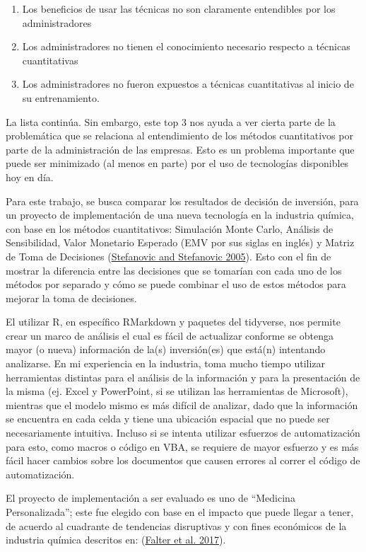 \documentclass[
]{book}
\providecommand{\tightlist}{%
  \setlength{\itemsep}{0pt}\setlength{\parskip}{0pt}}
\begin{document}
\begin{enumerate}
\def\labelenumi{\arabic{enumi}.}
\tightlist
\item
  Los beneficios de usar las técnicas no son claramente entendibles
  por los administradores
\item
  Los administradores no tienen el conocimiento necesario respecto a
  técnicas cuantitativas
\item
  Los administradores no fueron expuestos a técnicas cuantitativas al
  inicio de su entrenamiento.
\end{enumerate}

La lista continúa. Sin embargo, este top 3 nos ayuda a ver cierta parte
de la problemática que se relaciona al entendimiento de los métodos
cuantitativos por parte de la administración de las empresas. Esto es un
problema importante que puede ser minimizado (al menos en parte) por el
uso de tecnologías disponibles hoy en día.

Para este trabajo, se busca comparar los resultados de decisión de
inversión, para un proyecto de implementación de una nueva tecnología
en la industria química, con base en los métodos cuantitativos:
Simulación Monte Carlo, Análisis de Sensibilidad, Valor Monetario
Esperado (EMV por sus siglas en inglés) y Matriz de Toma de Decisiones
(\protect\hyperlink{ref-Stefanovic2005}{Stefanovic and Stefanovic 2005}). Esto con el fin de mostrar la diferencia entre las
decisiones que se tomarían con cada uno de los métodos por separado y
cómo se puede combinar el uso de estos métodos para mejorar la toma de
decisiones.

El utilizar R, en específico RMarkdown y paquetes del tidyverse, nos
permite crear un marco de análisis el cual es fácil de actualizar
conforme se obtenga mayor (o nueva) información de la(s) inversión(es)
que está(n) intentando analizarse. En mi experiencia en la industria,
toma mucho tiempo utilizar herramientas distintas para el análisis de la
información y para la presentación de la misma (ej. Excel y PowerPoint,
si se utilizan las herramientas de Microsoft), mientras que el modelo mismo
es más difícil de analizar, dado que la información se encuentra en cada celda
y tiene una ubicación espacial que no puede ser necesariamente intuitiva.
Incluso si se intenta utilizar esfuerzos de automatización para esto, como
macros o código en VBA, se requiere de mayor esfuerzo y es más fácil hacer
cambios sobre los documentos que causen errores al correr el código de
automatización.

El proyecto de implementación a ser evaluado es uno de ``Medicina Personalizada'';
este fue elegido con base en el impacto que puede llegar a tener,
de acuerdo al cuadrante de tendencias disruptivas y con
fines económicos de la industria química descritos en: (\protect\hyperlink{ref-Falter2017}{Falter et al. 2017}).
\end{document}
